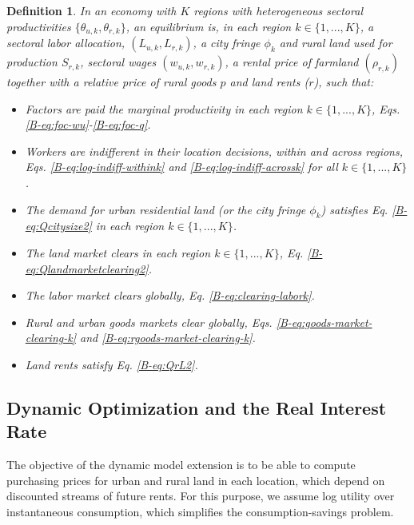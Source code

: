 \documentclass[11pt]{report}
\newtheorem{definition}{Definition}
\begin{document}
\begin{definition}
	In an economy with $K$ regions with heterogeneous sectoral productivities $\{\theta_{u,k}, \theta_{r,k}\}$, an equilibrium is, in each region $k \in \{1, ..., K\}$, a sectoral labor allocation, $(L_{u,k},L_{r,k})$, a city fringe $\phi_k$ and rural land used for production $S_{r,k}$, sectoral wages $(w_{u,k},w_{r,k})$, a rental price of farmland $(\rho_{r,k})$ together with a relative price of rural goods $p$ and land rents ($r$), such that:
	\begin{itemize}
		\item Factors are paid the marginal productivity in each region $k \in \{1, ..., K\}$, Eqs. \ref{B-eq:foc-wu}-\ref{B-eq:foc-q}.
		\item Workers are indifferent in their location decisions, within and across regions, Eqs. \ref{B-eq:log-indiff-withink} and \ref{B-eq:log-indiff-acrossk} for all $k \in \{1, ..., K\}$.
		\item The demand for urban residential land (or the city fringe $\phi_k$) satisfies Eq. \ref{B-eq:Qcitysize2} in each region $k \in \{1, ..., K\}$.
		\item The land market clears in each region $k \in \{1, ..., K\}$, Eq. \ref{B-eq:Qlandmarketclearing2}.
		\item The labor market clears globally, Eq. \ref{B-eq:clearing-labork}.
		\item Rural and urban goods markets clear globally, Eqs. \ref{B-eq:goods-market-clearing-k} and \ref{B-eq:rgoods-market-clearing-k}.  
		\item Land rents satisfy Eq. \ref{B-eq:QrL2}.
	\end{itemize} \label{B-sec:eqdefinition}
\end{definition}

\subsection{Dynamic Optimization and the Real Interest Rate}\label{B-sec:extensions-dynamic}

The objective of the dynamic model extension is to be able to compute purchasing prices for urban and rural land in each location, which depend on discounted streams of future rents. For this purpose, we assume log utility over instantaneous consumption, which simplifies the consumption-savings problem. 
\end{document}
